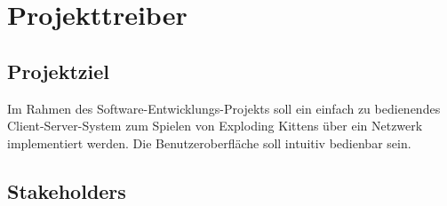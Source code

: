 \chapter{Projekttreiber}

\section{Projektziel}

Im Rahmen des Software-Entwicklungs-Projekts {\the\year}
soll ein einfach zu bedienendes Client-Server-System zum Spielen von Exploding Kittens
über ein Netzwerk implementiert werden. Die Benutzeroberfläche soll intuitiv bedienbar sein.

\section{Stakeholders}

\setcounter{sh}{10}


